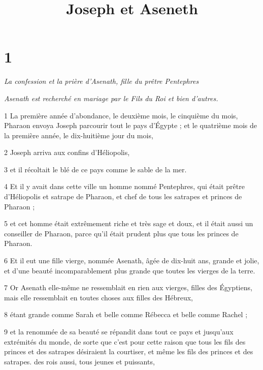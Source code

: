 


\title{Joseph et Aseneth}

\chapter{1}

\par \textit{La confession et la prière d'Asenath, fille du prêtre Pentephres}

\par \textit{Asenath est recherché en mariage par le Fils du Roi et bien d'autres.}

\par 1 La première année d'abondance, le deuxième mois, le cinquième du mois, Pharaon envoya Joseph parcourir tout le pays d'Égypte ; et le quatrième mois de la première année, le dix-huitième jour du mois,

\par 2 Joseph arriva aux confins d'Héliopolis,

\par 3 et il récoltait le blé de ce pays comme le sable de la mer.

\par 4 Et il y avait dans cette ville un homme nommé Pentephres, qui était prêtre d'Héliopolis et satrape de Pharaon, et chef de tous les satrapes et princes de Pharaon ;

\par 5 et cet homme était extrêmement riche et très sage et doux, et il était aussi un conseiller de Pharaon, parce qu'il était prudent plus que tous les princes de Pharaon.

\par 6 Et il eut une fille vierge, nommée Asenath, âgée de dix-huit ans, grande et jolie, et d'une beauté incomparablement plus grande que toutes les vierges de la terre.

\par 7 Or Asenath elle-même ne ressemblait en rien aux vierges, filles des Égyptiens, mais elle ressemblait en toutes choses aux filles des Hébreux,

\par 8 étant grande comme Sarah et belle comme Rébecca et belle comme Rachel ;

\par 9 et la renommée de sa beauté se répandit dans tout ce pays et jusqu'aux extrémités du monde, de sorte que c'est pour cette raison que tous les fils des princes et des satrapes désiraient la courtiser, et même les fils des princes et des satrapes. des rois aussi, tous jeunes et puissants,

